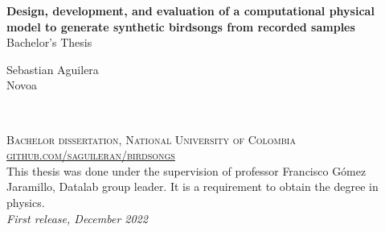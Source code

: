 



\begingroup
\thispagestyle{empty}
\centering
\vspace{0.4cm}\hspace{-3in}
\par\normalfont\fontsize{30}{30}\sffamily\selectfont
\textbf{Design, development, and
evaluation of a computational physical
model to generate synthetic birdsongs from recorded samples}\\
\centering
{\LARGE Bachelor's Thesis}\par %
\vspace*{1cm}
{\Huge Sebastian Aguilera\\Novoa}\par %
\endgroup



\newpage
~\vfill
\thispagestyle{empty}


\noindent \textsc{Bachelor dissertation, National University of Colombia}\\

\noindent \href{https://github.com/saguileran/birdsongs}{\textsc{github.com/saguileran/birdsongs}}\\ %

\noindent This thesis was done under the supervision of professor Francisco Gómez Jaramillo, Datalab group leader. It is a requirement to obtain the degree in physics. \\ %

\noindent \textit{First release, December 2022} %





